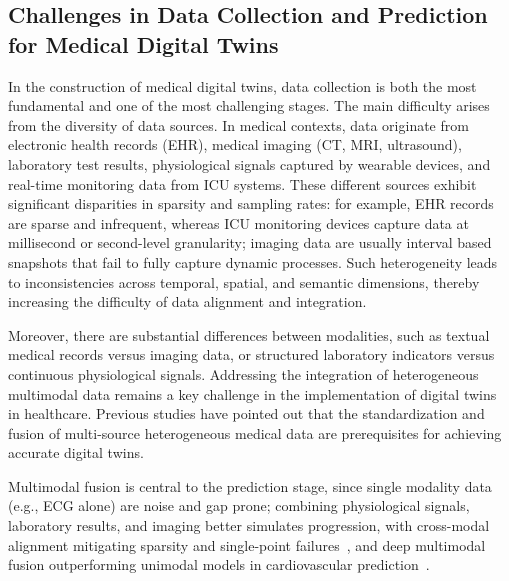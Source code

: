 \documentclass[journal]{IEEEtran}
\begin{document}
\subsection{Challenges in Data Collection and Prediction for Medical Digital Twins}

In the construction of medical digital twins, data collection is both the most fundamental and one of the most challenging stages. The main difficulty arises from the diversity of data sources. In medical contexts, data originate from electronic health records (EHR), medical imaging (CT, MRI, ultrasound), laboratory test results, physiological signals captured by wearable devices, and real-time monitoring data from ICU systems. These different sources exhibit significant disparities in sparsity and sampling rates: for example, EHR records are sparse and infrequent, whereas ICU monitoring devices capture data at millisecond or second-level granularity; imaging data are usually interval based snapshots that fail to fully capture dynamic processes. Such heterogeneity leads to inconsistencies across temporal, spatial, and semantic dimensions, thereby increasing the difficulty of data alignment and integration.

Moreover, there are substantial differences between modalities, such as textual medical records versus imaging data, or structured laboratory indicators versus continuous physiological signals. Addressing the integration of heterogeneous multimodal data remains a key challenge in the implementation of digital twins in healthcare. Previous studies have pointed out that the standardization and fusion of multi-source heterogeneous medical data are prerequisites for achieving accurate digital twins\cite{tao2019digital,reddy2015healthcare}.

Multimodal fusion is central to the prediction stage, since single modality data (e.g., ECG alone) are noise and gap prone; combining physiological signals, laboratory results, and imaging better simulates progression, with cross-modal alignment mitigating sparsity and single-point failures~\cite{baltrusaitis2019multimodal}, and deep multimodal fusion outperforming unimodal models in cardiovascular prediction~\cite{huang2020fusion}.
\end{document}
